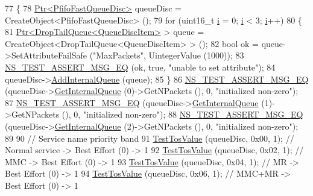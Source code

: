 \begin{DoxyCode}
77 \{
78   \hyperlink{classns3_1_1Ptr}{Ptr<PfifoFastQueueDisc>} queueDisc = CreateObject<PfifoFastQueueDisc> ();
79   \textcolor{keywordflow}{for} (uint16\_t \hyperlink{bernuolliDistribution_8m_a6f6ccfcf58b31cb6412107d9d5281426}{i} = 0; \hyperlink{bernuolliDistribution_8m_a6f6ccfcf58b31cb6412107d9d5281426}{i} < 3; \hyperlink{bernuolliDistribution_8m_a6f6ccfcf58b31cb6412107d9d5281426}{i}++)
80     \{
81       \hyperlink{classns3_1_1Ptr}{Ptr<DropTailQueue<QueueDiscItem>} > queue = 
      CreateObject<DropTailQueue<QueueDiscItem> > ();
82       \textcolor{keywordtype}{bool} ok = queue->SetAttributeFailSafe (\textcolor{stringliteral}{"MaxPackets"}, UintegerValue (1000));
83       \hyperlink{group__testing_ga2a9d78cffb3db8e867c35fff0b698cf5}{NS\_TEST\_ASSERT\_MSG\_EQ} (ok, \textcolor{keyword}{true}, \textcolor{stringliteral}{"unable to set attribute"});
84       queueDisc->\hyperlink{classns3_1_1QueueDisc_a0599223e2a3976ef042a56c2923a2b61}{AddInternalQueue} (queue);
85     \}
86   \hyperlink{group__testing_ga2a9d78cffb3db8e867c35fff0b698cf5}{NS\_TEST\_ASSERT\_MSG\_EQ} (queueDisc->\hyperlink{classns3_1_1QueueDisc_adf09b498c07c5677c26ea4b8309def74}{GetInternalQueue} (0)->GetNPackets 
      (), 0, \textcolor{stringliteral}{"initialized non-zero"});
87   \hyperlink{group__testing_ga2a9d78cffb3db8e867c35fff0b698cf5}{NS\_TEST\_ASSERT\_MSG\_EQ} (queueDisc->\hyperlink{classns3_1_1QueueDisc_adf09b498c07c5677c26ea4b8309def74}{GetInternalQueue} (1)->GetNPackets 
      (), 0, \textcolor{stringliteral}{"initialized non-zero"});
88   \hyperlink{group__testing_ga2a9d78cffb3db8e867c35fff0b698cf5}{NS\_TEST\_ASSERT\_MSG\_EQ} (queueDisc->\hyperlink{classns3_1_1QueueDisc_adf09b498c07c5677c26ea4b8309def74}{GetInternalQueue} (2)->GetNPackets 
      (), 0, \textcolor{stringliteral}{"initialized non-zero"});
89 
90                                       \textcolor{comment}{// Service name       priority         band}
91   \hyperlink{classPfifoFastQueueDiscTosPrioritization_ae30d51ac2cd62d6874f0fdaf619cf939}{TestTosValue} (queueDisc, 0x00, 1);  \textcolor{comment}{// Normal service  -> Best Effort (0) -> 1}
92   \hyperlink{classPfifoFastQueueDiscTosPrioritization_ae30d51ac2cd62d6874f0fdaf619cf939}{TestTosValue} (queueDisc, 0x02, 1);  \textcolor{comment}{// MMC             -> Best Effort (0) -> 1}
93   \hyperlink{classPfifoFastQueueDiscTosPrioritization_ae30d51ac2cd62d6874f0fdaf619cf939}{TestTosValue} (queueDisc, 0x04, 1);  \textcolor{comment}{// MR              -> Best Effort (0) -> 1}
94   \hyperlink{classPfifoFastQueueDiscTosPrioritization_ae30d51ac2cd62d6874f0fdaf619cf939}{TestTosValue} (queueDisc, 0x06, 1);  \textcolor{comment}{// MMC+MR          -> Best Effort (0) -> 1}

\end{DoxyCode}
